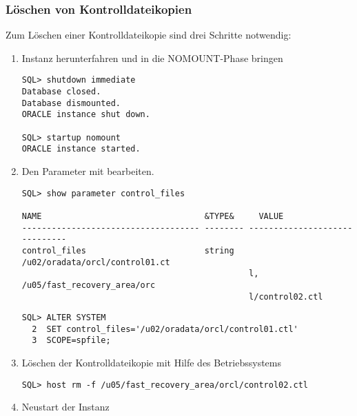         \subsubsection{Löschen von Kontrolldateikopien}
        Zum Löschen einer Kontrolldateikopie sind drei Schritte notwendig:
        \begin{enumerate}
          \item Instanz herunterfahren und in die NOMOUNT-Phase bringen
            \begin{lstlisting}[caption={Löschen von Kontrolldateikopien 1},label=admin28,language=sqlplus]
SQL> shutdown immediate
Database closed.
Database dismounted.
ORACLE instance shut down.

SQL> startup nomount
ORACLE instance started.
            \end{lstlisting}
          \item Den Parameter  mit  bearbeiten.
            \begin{lstlisting}[caption={Löschen von Kontrolldateikopien 2a},label=admin29,language=sqlplus]
SQL> show parameter control_files

NAME                                 &TYPE&     VALUE
------------------------------------ -------- ------------------------------
control_files                        string   /u02/oradata/orcl/control01.ct
                                              l, /u05/fast_recovery_area/orc
                                              l/control02.ctl
						\end{lstlisting}
\clearpage
						\begin{lstlisting}[caption={Löschen von Kontrolldateikopien
						2b},language=oracle_sql]
SQL> ALTER SYSTEM
  2  SET control_files='/u02/oradata/orcl/control01.ctl'
  3  SCOPE=spfile;
            \end{lstlisting}
          \item Löschen der Kontrolldateikopie mit Hilfe des Betriebssystems
            \begin{lstlisting}[caption={Löschen von Kontrolldateikopien 3},label=admin29a,language=sqlplus]
SQL> host rm -f /u05/fast_recovery_area/orcl/control02.ctl
            \end{lstlisting}
          \item Neustart der Instanz
        \end{enumerate}

        \begin{literaturinternet}
          \item \cite{i1006088}
        \end{literaturinternet}

